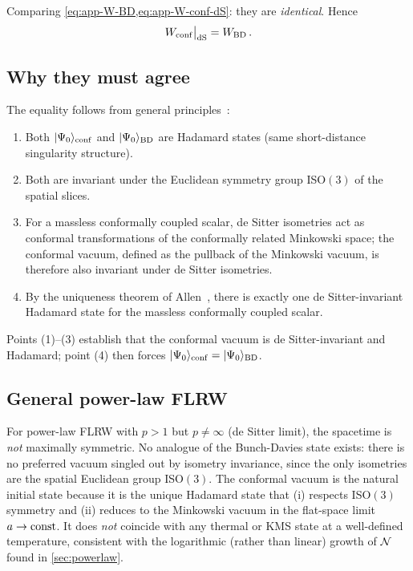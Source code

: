 Comparing \cref{eq:app-W-BD,eq:app-W-conf-dS}: they are \emph{identical}.  Hence
%
\begin{equation}
  W_{\rm conf}\big|_{\rm dS} = W_{\rm BD} \,.
\end{equation}

\subsection*{Why they must agree}

The equality follows from general principles~\cite{Allen1985}:
\begin{enumerate}
\item Both $|\Psi_{0}\rangle_{\rm conf}$ and $|\Psi_{0}\rangle_{\rm BD}$ are Hadamard states
  (same short-distance singularity structure).
\item Both are invariant under the Euclidean symmetry group ISO$(3)$ of the spatial slices.
\item For a massless conformally coupled scalar, de Sitter isometries act as conformal
  transformations of the conformally related Minkowski space; the conformal vacuum, defined
  as the pullback of the Minkowski vacuum, is therefore also invariant under de Sitter
  isometries.
\item By the uniqueness theorem of Allen~\cite{Allen1985}, there is exactly one de Sitter-invariant
  Hadamard state for the massless conformally coupled scalar.
\end{enumerate}
Points (1)--(3) establish that the conformal vacuum is de Sitter-invariant and Hadamard;
point (4) then forces $|\Psi_{0}\rangle_{\rm conf} = |\Psi_{0}\rangle_{\rm BD}$.

\subsection*{General power-law FLRW}

For power-law FLRW with $p > 1$ but $p \neq \infty$ (de Sitter limit), the spacetime is
\emph{not} maximally symmetric.  No analogue of the Bunch-Davies state exists: there is no
preferred vacuum singled out by isometry invariance, since the only isometries are the
spatial Euclidean group ISO$(3)$.  The conformal vacuum is the natural initial state
because it is the unique Hadamard state that (i) respects ISO$(3)$ symmetry and
(ii) reduces to the Minkowski vacuum in the flat-space limit $a \to \mathrm{const}$.
It does \emph{not} coincide with any thermal or KMS state at a well-defined temperature,
consistent with the logarithmic (rather than linear) growth of $\mathcal{N}$ found in
\cref{sec:powerlaw}.
